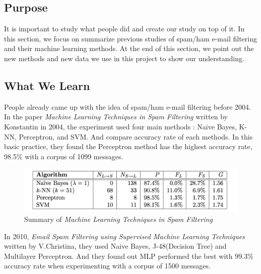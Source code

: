 
\subsection{Purpose}

It is important to study what people did and create our study on top of it. In this section, we focus on summarize previous studies of spam/ham e-mail filtering and their machine learning methods. At the end of this section, we point out the new methods and new data we use in this project to show our understanding.  \\

\subsection{What We Learn}
People already came up with the idea of spam/ham e-mail filtering before 2004. In the paper \textit{Machine Learning Techniques in Spam Filtering} written by Konstantin in 2004, the experiment used four main methods : Naive Bayes, K-NN, Perceptron, and SVM. And compare accuracy rate of each methods. In this basic practice, they found the Perceptron method has the highest accuracy rate, 98.5\% with a corpus of 1099 messages. \\

\begin{figure}[H]
	\centering
	\includegraphics[scale=1.0, width=\linewidth]{2004.png}
	\caption{Summary of \textit{Machine Learning Techniques in Spam Filtering}}
	\label{paper_summary_2004}
\end{figure}

In 2010, \textit{Email Spam Filtering using Supervised Machine Learning Techniques } written by V.Christina, they used Naive Bayes, J-48(Decision Tree) and Multilayer Perceptron. And they found out MLP performed the best with 99.3\% accuracy rate when experimenting with a corpus of 1500 messages.\\

